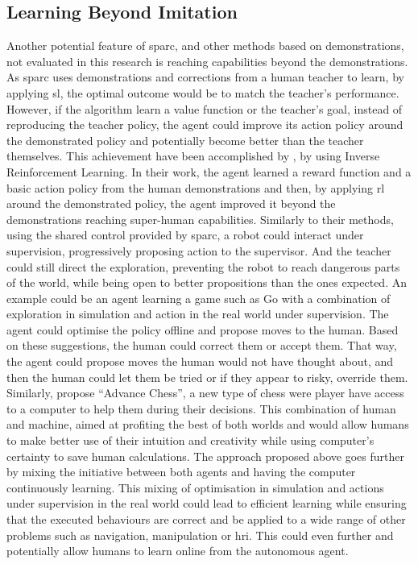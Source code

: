 \subsection{Learning Beyond Imitation}
Another potential feature of \gls{sparc}, and other methods based on demonstrations, not evaluated in this research is reaching capabilities beyond the demonstrations. As \gls{sparc} uses demonstrations and corrections from a human teacher to learn, by applying \gls{sl}, the optimal outcome would be to match the teacher's performance. However, if the algorithm learn a value function or the teacher's goal, instead of reproducing the teacher policy, the agent could improve its action policy around the demonstrated policy and potentially become better than the teacher themselves. This achievement have been accomplished by \cite{abbeel2004apprenticeship}, by using Inverse Reinforcement Learning. In their work, the agent learned a reward function and a basic action policy from the human demonstrations and then, by applying \gls{rl} around the demonstrated policy, the agent improved it beyond the demonstrations reaching super-human capabilities. Similarly to their methods, using the shared control provided by \gls{sparc}, a robot could interact under supervision, progressively proposing action to the supervisor. And the teacher could still direct the exploration, preventing the robot to reach dangerous parts of the world, while being open to better propositions than the ones expected. An example could be an agent learning a game such as Go with a combination of exploration in simulation and action in the real world under supervision. The agent could optimise the policy offline and propose moves to the human. Based on these suggestions, the human could correct them or accept them. That way, the agent could propose moves the human would not have thought about, and then the human could let them be tried or if they appear to risky, override them. Similarly, \cite{kasparov2010chess} propose ``Advance Chess'', a new type of chess were player have access to a computer to help them during their decisions. This combination of human and machine, aimed at profiting the best of both worlds and would allow humans to make better use of their intuition and creativity while using computer's certainty to save human calculations. The approach proposed above goes further by mixing the initiative between both agents and having the computer continuously learning. This mixing of optimisation in simulation and actions under supervision in the real world could lead to efficient learning while ensuring that the executed behaviours are correct and be applied to a wide range of other problems such as navigation, manipulation or \gls{hri}. This could even further and potentially allow humans to learn online from the autonomous agent. %

